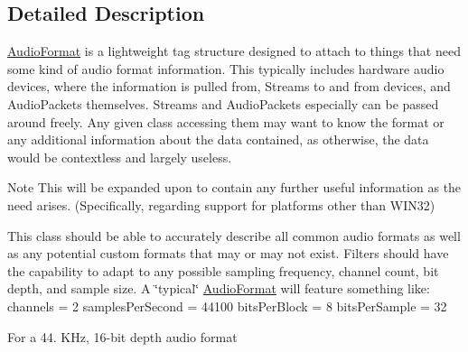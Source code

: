 \subsection{Detailed Description}
\hyperlink{struct_d_x_1_1_audio_1_1_audio_format}{Audio\-Format} is a lightweight tag structure designed to attach to things that need some kind of audio format information. This typically includes hardware audio devices, where the information is pulled from, Streams to and from devices, and Audio\-Packets themselves. Streams and Audio\-Packets especially can be passed around freely. Any given class accessing them may want to know the format or any additional information about the data contained, as otherwise, the data would be contextless and largely useless. 

\begin{DoxyNote}{Note}
This will be expanded upon to contain any further useful information as the need arises. (Specifically, regarding support for platforms other than W\-I\-N32)
\end{DoxyNote}
This class should be able to accurately describe all common audio formats as well as any potential custom formats that may or may not exist. Filters should have the capability to adapt to any possible sampling frequency, channel count, bit depth, and sample size. A \char`\"{}typical\char`\"{} \hyperlink{struct_d_x_1_1_audio_1_1_audio_format}{Audio\-Format} will feature something like\-: channels = 2 samples\-Per\-Second = 44100 bits\-Per\-Block = 8 bits\-Per\-Sample = 32

For a 44. K\-Hz, 16-\/bit depth audio format 

